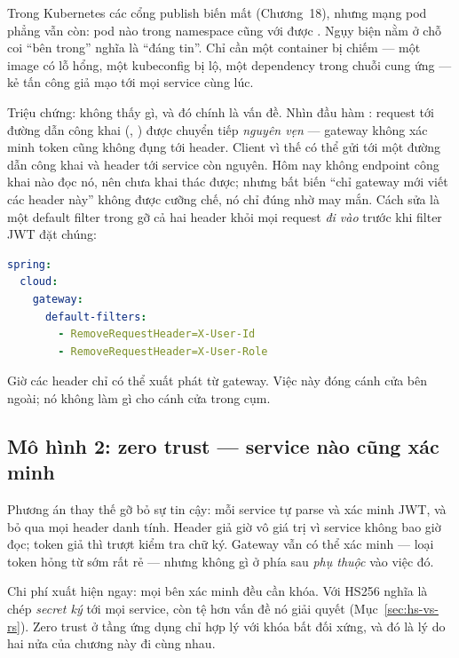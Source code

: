Trong Kubernetes các cổng publish biến mất (Chương~18), nhưng mạng pod
phẳng vẫn còn: pod nào trong namespace cũng với được
. Ngụy biện nằm ở chỗ coi ``bên trong'' nghĩa
là ``đáng tin''. Chỉ cần một container bị chiếm --- một image có lỗ
hổng, một kubeconfig bị lộ, một dependency trong chuỗi cung ứng --- kẻ
tấn công giả mạo  tới mọi service cùng lúc.

\begin{pitfall}
Triệu chứng: không thấy gì, và đó chính là vấn đề. Nhìn đầu hàm
: request tới đường dẫn công khai
(, ) được chuyển tiếp
\emph{nguyên vẹn} --- gateway không xác minh token cũng không đụng tới
header. Client vì thế có thể gửi  tới một đường dẫn
công khai và header tới service còn nguyên. Hôm nay không endpoint công
khai nào đọc nó, nên chưa khai thác được; nhưng bất biến ``chỉ gateway
mới viết các header này'' không được cưỡng chế, nó chỉ đúng nhờ may
mắn. Cách sửa là một default filter trong  gỡ cả
hai header khỏi mọi request \emph{đi vào} trước khi filter JWT đặt
chúng:
\begin{lstlisting}[language=yaml]
spring:
  cloud:
    gateway:
      default-filters:
        - RemoveRequestHeader=X-User-Id
        - RemoveRequestHeader=X-User-Role
\end{lstlisting}
Giờ các header chỉ có thể xuất phát từ gateway. Việc này đóng cánh cửa
bên ngoài; nó không làm gì cho cánh cửa trong cụm.
\end{pitfall}

\subsection{Mô hình 2: zero trust --- service nào cũng xác minh}

Phương án thay thế gỡ bỏ sự tin cậy: mỗi service tự parse và xác minh
JWT, và bỏ qua mọi header danh tính. Header giả giờ vô giá trị vì
service không bao giờ đọc; token giả thì trượt kiểm tra chữ ký. Gateway
vẫn có thể xác minh --- loại token hỏng từ sớm rất rẻ --- nhưng không gì
ở phía sau \emph{phụ thuộc} vào việc đó.

Chi phí xuất hiện ngay: mọi bên xác minh đều cần khóa. Với HS256 nghĩa
là chép \emph{secret ký} tới mọi service, còn tệ hơn vấn đề nó giải
quyết (Mục~\ref{sec:hs-vs-rs}). Zero trust ở tầng ứng dụng chỉ hợp lý
với khóa bất đối xứng, và đó là lý do hai nửa của chương này đi cùng
nhau.

